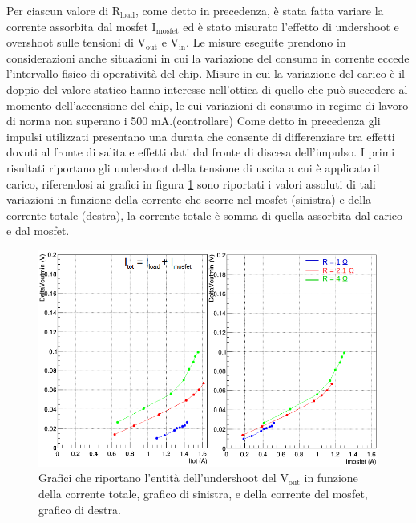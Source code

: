 Per ciascun valore di $\mathrm{R_{load}}$, come detto in precedenza, è stata fatta variare la corrente assorbita dal mosfet $\mathrm{I_{mosfet}}$ ed è stato misurato l'effetto di undershoot e overshoot sulle tensioni di $\mathrm{V_{out}}$ e $\mathrm{V_{in}}$. 
Le misure eseguite prendono in considerazioni anche situazioni in cui la variazione del consumo in corrente eccede l'intervallo fisico di operatività del chip. 
Misure in cui la variazione del carico è il doppio del valore statico hanno interesse nell'ottica di quello che può succedere al momento dell'accensione del chip, le cui variazioni di consumo in regime di lavoro di norma non superano i 500 mA.(controllare) 
Come detto in precedenza gli impulsi utilizzati presentano una durata che consente di differenziare tra effetti dovuti al fronte di salita e effetti dati dal fronte di discesa dell'impulso. 
I primi risultati riportano gli undershoot della tensione di uscita a cui è applicato il carico, riferendosi ai grafici in figura \ref{VoutUnd} sono riportati i valori assoluti di tali variazioni in funzione della corrente che scorre nel mosfet (sinistra) e della corrente totale (destra), la corrente totale è somma di quella assorbita dal carico e dal mosfet. 
\begin{figure}
\centering
\includegraphics[scale=.44]{Immagini/VoutUnd}
\caption{Grafici che riportano l'entità dell'undershoot del $\mathrm{V_{out}}$ in funzione della corrente totale, grafico di sinistra, e della corrente del mosfet, grafico di destra.}
\label{VoutUnd}
\end{figure}
